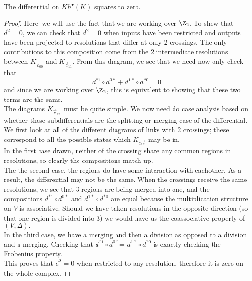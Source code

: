 \begin{framedtuftepage}
\begin{claim} The differential on $Kh^\bullet(K)$ squares to zero. 
\end{claim}  
\begin{proof}

Here, we will use the fact that we are working over $\Z_2$. To show that $d^2=0$, we can check that $d^2=0$ when inputs have been restricted and outputs have been projected to resolutions that differ at only 2 crossings. 
 The only contributions to this composition come from the 2 intermediate resolutions between $K_{\vec c_{00}}$ and $K_{\vec c_{11}}$. 
From this diagram, we see that we need now only check that 
\[d^{*1}\circ d^{0*} + d^{1*}\circ d^{*0}=0\]
and since we are working over $\Z_2$, this is equivalent to showing that these two terms are the same. \\
The diagrams $K_{\vec c_{**}}$ must be quite simple.
 We now need do case analysis based on whether these subdifferentials are the splitting or merging case of the differential. We first look at all of the different diagrams of links with 2 crossings; these correspond to all the possible states which $K_{\vec{c_{**}}}$ may be in. \\
In the first case drawn, neither of the crossing share any common regions in resolutions, so clearly the compositions match up. \\
 The the second case, the regions do have some interaction with eachother. As a result, the differential may not be the same. When the crossings receive the same resolutions, we see that 3 regions are being merged into one, and the compositions $d^{*1}\circ d^{0*} $ and $d^{1*}\circ d^{*0}$ are equal because the multiplication structure on $V$ is associative. Should we have taken resolutions in the opposite direction (so that one region is divided into 3) we would have us the coassociative property of $(V, \Delta).$\\
 In the third case, we have a merging and then a division as opposed to a division and a merging. Checking that $d^{*1}\circ d^{0*}$= $d^{1*}\circ d^{*0}$ is exactly checking the Frobenius property. \\
This proves that $d^2=0$ when restricted to any resolution, therefore it is zero on the whole complex. 
\end{proof}
\end{framedtuftepage}
